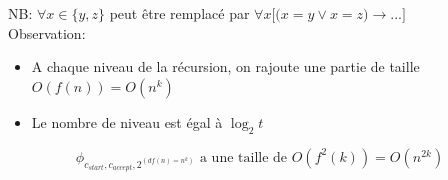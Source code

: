 \documentclass[a4paper,12pt]{article}
\begin{document}
    NB: $\forall x \in \big\{y, z\big\}$ peut être remplacé par $\forall x \Big[\big( x = y \vee x = z\big) \rightarrow ... \Big]$\\

    Observation:
    \begin{itemize}
     \item A chaque niveau de la récursion, on rajoute une partie de taille $O(f(n)) = O(n^k)$
     \item Le nombre de niveau est égal à $\log_2 t$
    \end{itemize}

    $$\phi_{c_{start}, c_{accept}, 2^{(df(n) = n^k)}} \text{ a une taille de } O(f^2(k)) = O(n^{2k})$$
\end{document}
